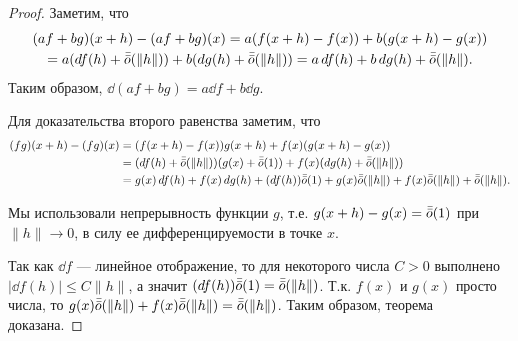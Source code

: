 \documentclass[a4paper]{article}
\theoremstyle{named}
\begin{document}
    \begin{proof}
        Заметим, что
        \begin{multline*}
            (af+bg)(x+h) - (af + bg)(x) = a(f(x+h) - f(x)) + b(g(x+h) - g(x))\\
            = a(\mathop{}\!d f(h) + \bar{\bar{o}}(\|h\|)) + b(\mathop{}\!d g (h) + \bar{\bar{o}}(\|h\|))
            = a\mathop{}\!d f(h) + b\mathop{}\!d g(h) + \bar{\bar{o}}(\|h\|).
        \end{multline*}
        Таким образом, $\dd(af + bg) = a\dd f +b\dd g$.

        Для доказательства второго равенства заметим, что
        \begin{align*}
            (fg)(x+h) - (fg)(x) 
            &= (f(x+h) - f(x))g(x+h) + f(x)(g(x+h) - g(x)) \\
            &= (\mathop{}\!d f(h) + \bar{\bar{o}}(\|h\|))(g(x) +\bar{\bar{o}}(1)) + f(x)(\mathop{}\!d g (h) + \bar{\bar{o}}(\|h\|)) \\
            &= g(x)\mathop{}\!d f(h) + f(x)\mathop{}\!d g(h) + (\mathop{}\!d f(h))\bar{\bar{o}}(1) + g(x)\bar{\bar{o}}(\|h\|)+ f(x)\bar{\bar{o}}(\|h\|) + \bar{\bar{o}}(\|h\|).
        \end{align*}

        Мы использовали непрерывность функции $g$, т.е. $g(x+h)-g(x) = \bar{\bar{o}}(1)$ при $\|h\| \to 0$,
        в силу ее дифференцируемости в точке $x$.

        Так как $\dd f$ --- линейное отображение, то для некоторого числа $C>0$ выполнено $|\dd f(h)|\leq C\|h\|$, а значит $(\mathop{}\!d f(h))\bar{\bar{o}}(1) = \bar{\bar{o}}(\|h\|)$.
        Т.к. $f(x)$ и $g(x)$ просто числа, то $ g(x)\bar{\bar{o}}(\|h\|)+ f(x)\bar{\bar{o}}(\|h\|) = \bar{\bar{o}}(\|h\|)$.
        Таким образом, теорема доказана.
    \end{proof}
\end{document}
